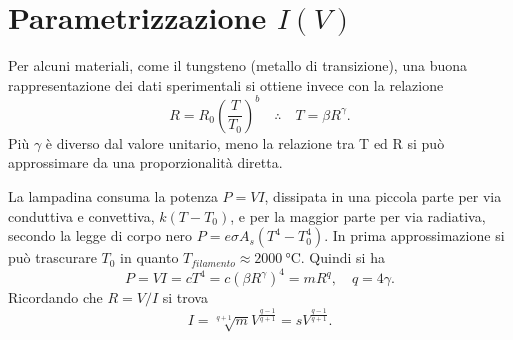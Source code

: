 \setcounter{section}{0}
\renewcommand\thesection{\Alph{section}}

\section{Parametrizzazione \texorpdfstring{$I(V)$}{I(V)}}
Per alcuni materiali, come il tungsteno (metallo di transizione), una buona
rappresentazione dei dati sperimentali si ottiene invece con la relazione
\begin{equation}
    R=R_0\left(\frac{T}{T_0}\right)^b\quad\therefore\quad T=\beta R^{\gamma}.
\end{equation}
Più $\gamma$ è diverso dal valore unitario, meno la relazione tra T ed R si può approssimare da una proporzionalità diretta.

La lampadina consuma la potenza $P=VI$, dissipata in una piccola parte per via
conduttiva e convettiva, $k(T-T_0)$, e per la maggior parte per via radiativa, secondo la legge di corpo nero $P=e\sigma A_s(T^4-T_0^4)$. In prima approssimazione si può trascurare $T_0$ in quanto $T_{filamento}\approx\SI{2000}{\celsius}$. Quindi si ha
\begin{equation}
    P=VI=cT^4=c(\beta R^{\gamma})^4=mR^q,\quad q=4\gamma.
\end{equation}
Ricordando che $R=V/I$ si trova
\begin{equation}
    I=\sqrt[q+1]{m}V^{\frac{q-1}{q+1}}=sV^{\frac{q-1}{q+1}}.
\end{equation}